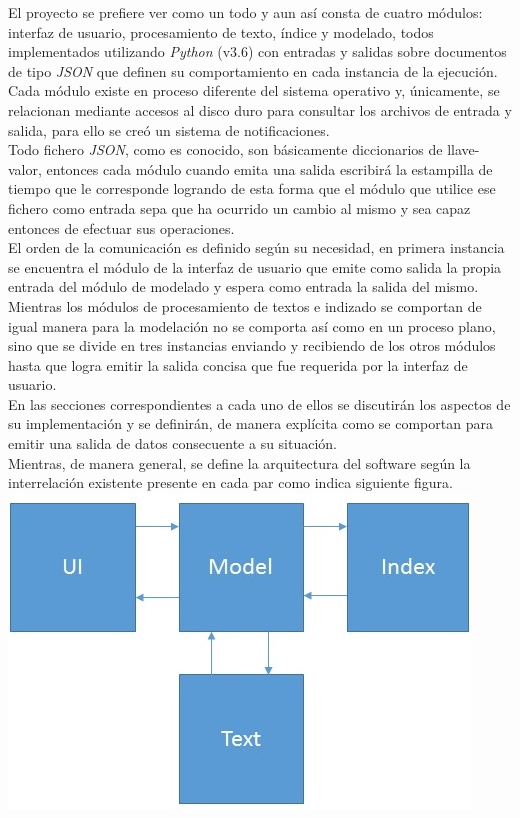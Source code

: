 \documentclass{llncs}
\begin{document}
El proyecto se prefiere ver como un todo y aun as\'i consta de cuatro m\'odulos: interfaz de usuario, procesamiento de texto,
\'indice y modelado, todos implementados utilizando {\textit{Python}} (v3.6) con entradas y salidas sobre documentos de tipo
 {\textit{JSON}} que definen su comportamiento en cada instancia de la ejecuci\'on. \\
Cada m\'odulo existe en proceso diferente del sistema operativo y, \'unicamente, se relacionan mediante accesos al disco duro
para consultar los archivos de entrada y salida, para ello se cre\'o un sistema de notificaciones.\\
Todo fichero {\textit{JSON}}, como es conocido, son b\'asicamente diccionarios de llave-valor, entonces cada m\'odulo cuando
emita una salida escribir\'a la estampilla de tiempo que le corresponde logrando de esta forma que el m\'odulo que utilice ese
fichero como entrada sepa que ha ocurrido un cambio al mismo y sea capaz entonces de efectuar sus operaciones.\\
El orden de la comunicaci\'on es definido seg\'un su necesidad, en primera instancia se encuentra el m\'odulo de la interfaz de
usuario que emite como salida la propia entrada del m\'odulo de modelado y espera como entrada la salida del mismo. Mientras
los m\'odulos de procesamiento de textos e indizado se comportan de igual manera para la modelaci\'on no se comporta as\'i
como en un proceso plano, sino que se divide en tres instancias enviando y recibiendo de los otros m\'odulos hasta que logra
emitir la salida concisa que fue requerida por la interfaz de usuario. \\
En las secciones correspondientes a cada uno de ellos se discutir\'an los aspectos de su implementaci\'on y se definir\'an, de 
manera expl\'icita como se comportan para emitir una salida de datos consecuente a su situaci\'on.\\
Mientras, de manera general, se define la arquitectura del software seg\'un la interrelaci\'on existente presente en cada par
como indica siguiente figura.\\

{\includegraphics[]{structure}}
{\hfil{}}
\end{document}
